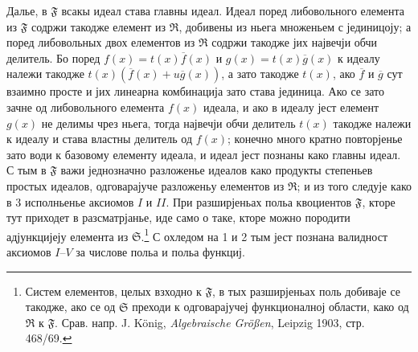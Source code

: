 ﻿\documentclass[11pt]{article}
\providecommand{\mR}{\mathfrak{R}}
\providecommand{\mS}{\mathfrak{S}}
\providecommand{\mF}{\mathfrak{F}}
\begin{document}
Далье, в $\mF$ всакы идеал става главны идеал. Идеал поред либовольного елемента из $\mF$ содржи такодже елемент из $\mR$, добивены из ньега множеньем с јединицоју; а поред либовольных двох елементов из $\mR$ содржи такодже јих највечји обчи делитель. Бо поред $f(x)=t(x)\overline f(x)$ и $g(x)=t(x)\overline g(x)$ к идеалу належи такодже $t(x)(\overline f(x)+u\overline g(x))$, а зато такодже $t(x)$, ако $\overline f$ и $\overline g$ сут взаимно просте и јих линеарна комбинација зато става јединица. Ако се зато зачне од либовольного елемента $f(x)$ идеала, и ако в идеалу јест елемент $g(x)$ не делимы чрез ньега, тогда највечји обчи делитель $t(x)$ такодже належи к идеалу и става властны делитель од $f(x)$; конечно много кратно повторјенье зато води к базовому елементу идеала, и идеал јест познаны како главны идеал. С тым в $\mF$ важи једнозначно разложенье идеалов како продукты степеньев простых идеалов, одговарајуче разложеньу елементов из $\mR$; и из того следује како в 3 исполньенье аксиомов $I$ и $II$. При разширјеньах польа квоциентов $\mF$, кторе тут приходет в разсматрјанье, иде само о таке, кторе можно породити адјункцијеју елемента из $\mS$.\footnote{Систем елементов, целых взходно к $\mF$, в тых разширјеньах поль добиваје се такодже, ако се од $\mS$ преходи к одговарајучеј функционалној области, како од $\mR$ к $\mF$. Срав. напр. J. König, \emph{Algebraische Größen}, Leipzig 1903, стр. 468/69.} С охледом на 1 и 2 тым јест познана валидност аксиомов $I$--$V$ за числове польа и польа функциј.
\end{document}
